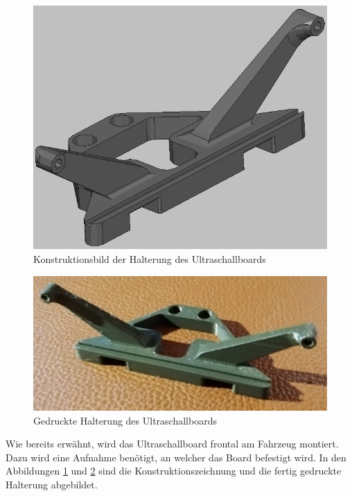 \begin{minipage}[b]{0.4\textwidth}
\centering
\begin{figure}[H] %
\includegraphics[width=.7\textwidth]{sec2/images/3DAnbaukomponenten/Konstruktionsbilder/UltraschallHalterungKonstruktion} 
\centering
\captionsetup{width=.95\textwidth}
\caption[Konstruktionsbild der Halterung des Ultraschallboards]{Konstruktionsbild der Halterung des Ultraschallboards}\centering
\label{fig:UltraschallHalterungKonstruktion}
\end{figure}
\end{minipage}
\begin{minipage}[b]{0.54\textwidth}
\begin{figure}[H] %
\includegraphics[width=.9\textwidth]{sec2/images/3DAnbaukomponenten/Druckbilder/UltraschallHalterungDruck} 
\centering
\captionsetup{width=.95\textwidth}
\caption[Gedruckte Halterung des Ultraschallboards]{Gedruckte Halterung des Ultraschallboards}\centering
\label{fig:UltraschallHalterungDruck}
\end{figure}
\end{minipage}
\vspace{4mm}

Wie bereits erwähnt, wird das Ultraschallboard frontal am Fahrzeug montiert. Dazu wird eine Aufnahme benötigt, an welcher das Board befestigt wird. In den Abbildungen \ref{fig:UltraschallHalterungKonstruktion} und \ref{fig:UltraschallHalterungDruck} sind die Konstruktionszeichnung und die fertig gedruckte Halterung abgebildet.\vspace{11pt}

